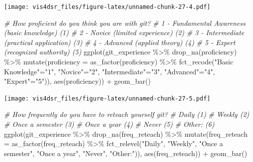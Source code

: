 \documentclass[
]{krantz}
\makeatletter
\newenvironment{Shaded}{\begin{snugshade}}{\end{snugshade}}
\newcommand{\AttributeTok}[1]{\textcolor[rgb]{0.61,0.61,0.61}{#1}}
\newcommand{\CommentTok}[1]{\textcolor[rgb]{0.37,0.37,0.37}{\textit{#1}}}
\newcommand{\FunctionTok}[1]{\textcolor[rgb]{0,0,0}{#1}}
\newcommand{\NormalTok}[1]{#1}
\newcommand{\OtherTok}[1]{\textcolor[rgb]{0.37,0.37,0.37}{#1}}
\newcommand{\SpecialCharTok}[1]{\textcolor[rgb]{0,0,0}{#1}}
\newcommand{\StringTok}[1]{\textcolor[rgb]{0.5,0.5,0.5}{#1}}
\newenvironment{kframe}{%
\medskip{}
\setlength{\fboxsep}{.8em}
 \def\at@end@of@kframe{}%
 \ifinner\ifhmode%
  \def\at@end@of@kframe{\end{minipage}}%
  \begin{minipage}{\columnwidth}%
 \fi\fi%
 \def\FrameCommand##1{\hskip\@totalleftmargin \hskip-\fboxsep
 \colorbox{shadecolor}{##1}\hskip-\fboxsep
     \hskip-\linewidth \hskip-\@totalleftmargin \hskip\columnwidth}%
 \MakeFramed {\advance\hsize-\width
   \@totalleftmargin\z@ \linewidth\hsize
   \@setminipage}}%
 {\par\unskip\endMakeFramed%
 \at@end@of@kframe}
\renewenvironment{Shaded}{\begin{kframe}}{\end{kframe}}
\makeatother
\begin{document}
\texttt{[image: vis4dsr\_files/figure-latex/unnamed-chunk-27-4.pdf]}

\begin{Shaded}
\begin{Highlighting}[]
\CommentTok{\# How proficient do you think you are with git?}
\CommentTok{\# 1 {-} Fundamental Awareness (basic knowledge) (1)}
\CommentTok{\# 2 {-} Novice (limited experience) (2)}
\CommentTok{\# 3 {-} Intermediate (practical application) (3)}
\CommentTok{\# 4 {-} Advanced (applied theory) (4)}
\CommentTok{\# 5 {-} Expert (recognized authority) (5)}
\FunctionTok{ggplot}\NormalTok{(git\_experience }\SpecialCharTok{\%\textgreater{}\%} 
         \FunctionTok{drop\_na}\NormalTok{(proficiency) }\SpecialCharTok{\%\textgreater{}\%}
         \FunctionTok{mutate}\NormalTok{(}\AttributeTok{proficiency =} \FunctionTok{as\_factor}\NormalTok{(proficiency) }\SpecialCharTok{\%\textgreater{}\%} 
             \FunctionTok{fct\_recode}\NormalTok{(}\StringTok{"Basic Knowledge"}\OtherTok{=}\StringTok{"1"}\NormalTok{, }
                        \StringTok{"Novice"}\OtherTok{=}\StringTok{"2"}\NormalTok{, }\StringTok{"Intermediate"}\OtherTok{=}\StringTok{"3"}\NormalTok{, }
                        \StringTok{"Advanced"}\OtherTok{=}\StringTok{"4"}\NormalTok{, }\StringTok{"Expert"}\OtherTok{=}\StringTok{"5"}\NormalTok{)), }
       \FunctionTok{aes}\NormalTok{(proficiency)) }\SpecialCharTok{+}
  \FunctionTok{geom\_bar}\NormalTok{()}
\end{Highlighting}
\end{Shaded}

\texttt{[image: vis4dsr\_files/figure-latex/unnamed-chunk-27-5.pdf]}

\begin{Shaded}
\begin{Highlighting}[]
\CommentTok{\# How frequently do you have to reteach yourself git?}
\CommentTok{\# Daily (1)}
\CommentTok{\# Weekly (2)}
\CommentTok{\# Once a semester (3)}
\CommentTok{\# Once a year (4)}
\CommentTok{\# Never (5)}
\CommentTok{\# Other: (6)}
\FunctionTok{ggplot}\NormalTok{(git\_experience }\SpecialCharTok{\%\textgreater{}\%}
         \FunctionTok{drop\_na}\NormalTok{(freq\_reteach) }\SpecialCharTok{\%\textgreater{}\%}
         \FunctionTok{mutate}\NormalTok{(}\AttributeTok{freq\_reteach =} \FunctionTok{as\_factor}\NormalTok{(freq\_reteach) }\SpecialCharTok{\%\textgreater{}\%} 
             \FunctionTok{fct\_relevel}\NormalTok{(}\StringTok{"Daily"}\NormalTok{, }\StringTok{"Weekly"}\NormalTok{, }\StringTok{"Once a semester"}\NormalTok{,}
                         \StringTok{"Once a year"}\NormalTok{, }\StringTok{"Never"}\NormalTok{, }\StringTok{"Other:"}\NormalTok{)), }
       \FunctionTok{aes}\NormalTok{(freq\_reteach)) }\SpecialCharTok{+}
  \FunctionTok{geom\_bar}\NormalTok{()}
\end{Highlighting}
\end{Shaded}
\end{document}
